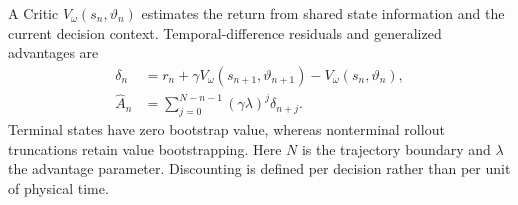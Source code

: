 A Critic $V_\omega(s_n,\vartheta_n)$ estimates the return from shared state information and the current decision context.
Temporal-difference residuals and generalized advantages are
\begin{equation}
 \begin{aligned}
 \delta_n&=r_n+\gamma V_\omega(s_{n+1},\vartheta_{n+1})
 -V_\omega(s_n,\vartheta_n), \\
 \widehat A_n&=\sum_{j=0}^{N-n-1}(\gamma\lambda)^j\delta_{n+j}.
 \end{aligned}
 \label{eq:gae}
\end{equation}
Terminal states have zero bootstrap value, whereas nonterminal rollout truncations retain value bootstrapping.
Here $N$ is the trajectory boundary and $\lambda$ the advantage parameter. Discounting is defined per decision
rather than per unit of physical time.


